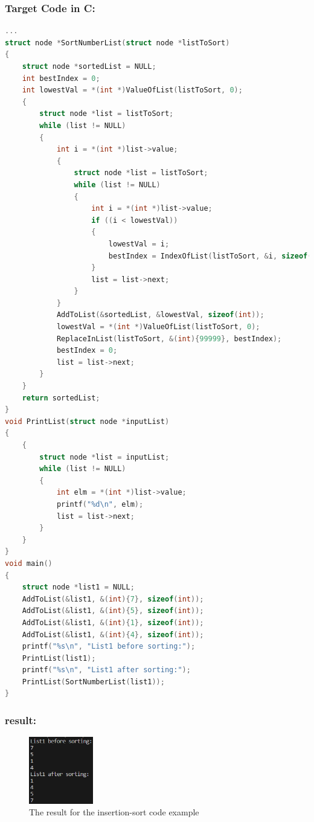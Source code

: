 \subsubsection{Target Code in C:}

\begin{lstlisting}[language = c, firstnumber=106, label={list:acceptance_test_insertionsort_output}, caption=Acceptance test output of the insertion-sort code example]
...
struct node *SortNumberList(struct node *listToSort) 
{ 
    struct node *sortedList = NULL; 
    int bestIndex = 0; 
    int lowestVal = *(int *)ValueOfList(listToSort, 0); 
    { 
        struct node *list = listToSort; 
        while (list != NULL) 
        { 
            int i = *(int *)list->value; 
            { 
                struct node *list = listToSort; 
                while (list != NULL) 
                { 
                    int i = *(int *)list->value; 
                    if ((i < lowestVal)) 
                    { 
                        lowestVal = i; 
                        bestIndex = IndexOfList(listToSort, &i, sizeof(int)); 
                    } 
                    list = list->next; 
                } 
            } 
            AddToList(&sortedList, &lowestVal, sizeof(int)); 
            lowestVal = *(int *)ValueOfList(listToSort, 0); 
            ReplaceInList(listToSort, &(int){99999}, bestIndex); 
            bestIndex = 0; 
            list = list->next; 
        } 
    } 
    return sortedList; 
} 
void PrintList(struct node *inputList) 
{ 
    { 
        struct node *list = inputList; 
        while (list != NULL) 
        { 
            int elm = *(int *)list->value; 
            printf("%d\n", elm); 
            list = list->next; 
        } 
    } 
} 
void main() 
{ 
    struct node *list1 = NULL; 
    AddToList(&list1, &(int){7}, sizeof(int)); 
    AddToList(&list1, &(int){5}, sizeof(int)); 
    AddToList(&list1, &(int){1}, sizeof(int)); 
    AddToList(&list1, &(int){4}, sizeof(int)); 
    printf("%s\n", "List1 before sorting:"); 
    PrintList(list1); 
    printf("%s\n", "List1 after sorting:"); 
    PrintList(SortNumberList(list1)); 
} 
\end{lstlisting}

\subsubsection{result:}

\begin{figure}[H] 
    \begin{center}
        \includegraphics[width=0.25\textwidth]{Files/Billeder: Appendix/Insertion Sort Result.png}
    \end{center}
    \caption{The result for the insertion-sort code example}
    \label{figure:insetion_sort_result}
\end{figure}

